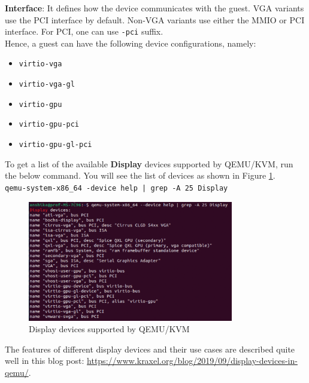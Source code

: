 \documentclass[a4paper,12pt, final]{report}
\begin{document}
\noindent \textbf{Interface}: It defines how the device communicates with the guest. VGA variants use the PCI interface by default. Non-VGA variants use either the MMIO or PCI interface. For PCI, one can use \verb|-pci| suffix.\\

\noindent Hence, a guest can have the following device configurations, namely:
\begin{itemize}
    \item \verb|virtio-vga|
    \item \verb|virtio-vga-gl|
    \item \verb|virtio-gpu|
    \item \verb|virtio-gpu-pci|
    \item \verb|virtio-gpu-gl-pci|
\end{itemize}

\noindent To get a list of the available \textbf{Display} devices supported by QEMU/KVM, run the below command. You will see the list of devices as shown in Figure \ref{fig:qemu_device_help}.\\
\texttt{qemu-system-x86\_64 -device help | grep -A 25 Display}

\begin{figure}[H]
    \centering
    \includegraphics[width=0.8\textwidth]{images/device_help.png}
    \caption{Display devices supported by QEMU/KVM}
    \label{fig:qemu_device_help}
\end{figure}

\noindent The features of different display devices and their use cases are described quite well in this blog post: \url{https://www.kraxel.org/blog/2019/09/display-devices-in-qemu/}.
\end{document}
